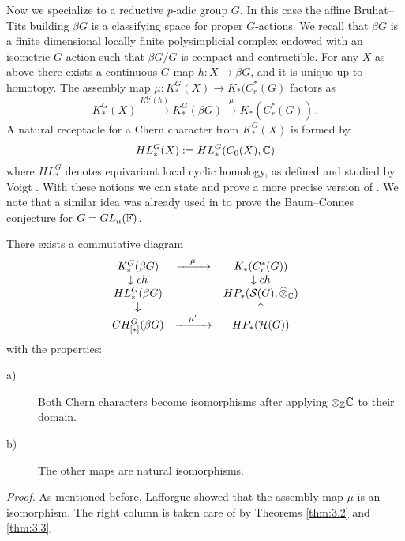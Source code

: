 Now we specialize to a reductive $p$-adic group $G$. In this case the affine 
Bruhat--Tits building $\beta G$ is a classifying space for proper $G$-actions. 
We recall that $\beta G$ is a finite dimensional locally finite polysimplicial 
complex endowed with an isometric $G$-action such that $\beta G / G$ 
is compact and contractible.
For any $X$ as above there exists a continuous $G$-map $h : X \to \beta G$,
and it is unique up to homotopy. The assembly map 
$\mu : K_*^G (X) \to K_* (C_r^* (G)$ factors as
\begin{equation}\label{eq:3.36}
K_*^G (X) \xrightarrow{K_*^G (h)} K_*^G (\beta G) \xrightarrow{\mu} K_* (C_r^* (G)) \,.
\end{equation}
A natural receptacle for a Chern character from $K_*^G (X)$ is formed by 
\[
HL_*^G (X) := HL_*^G (C_0 (X), \mathbb C)
\]
where $HL_*^G$ denotes equivariant local cyclic homology, as defined
and studied by Voigt \cite{Voi3}.
With these notions we can state and prove a more precise
version of \cite[Proposition 9.4]{BHP2}. We note that a similar idea
was already used in \cite{BHP1} to prove the Baum--Connes 
conjecture for $G = GL_n (\mathbb F )$.

\begin{thm}\label{thm:3.4}
There exists a commutative diagram 
\[
\begin{array}{ccc}
K_*^G (\beta G) & \xrightarrow{\quad \mu \quad} & K_* (C_r^* (G)) \\
\downarrow ch & & \downarrow ch \\
HL_*^G (\beta G) & & HP_* (\mathcal S (G),\widehat{\otimes}_{\mathbb C} ) \\
\downarrow & & \uparrow \\
CH_{[*]}^G (\beta G) & \xrightarrow{\quad \mu' \quad} & HP_* (\mathcal H (G)) 
\end{array}
\]
with the properties:
\begin{description}
\item[a)] Both Chern characters become isomorphisms after 
applying $\otimes_{\mathbb Z} \mathbb C$ to their domain.
\item[b)] The other maps are natural isomorphisms.
\end{description}
\end{thm}
\emph{Proof.} As mentioned before, Lafforgue \cite{Laf} showed that the 
assembly map $\mu$ is an isomorphism. The right column is taken 
care of by Theorems \ref{thm:3.2} and \ref{thm:3.3}. 

